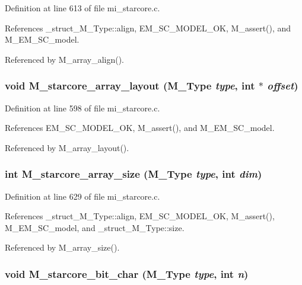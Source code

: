 Definition at line 613 of file mi\_\-starcore.c.

References \_\-struct\_\-M\_\-Type::align, EM\_\-SC\_\-MODEL\_\-OK, M\_\-assert(), and M\_\-EM\_\-SC\_\-model.

Referenced by M\_\-array\_\-align().
\subsubsection{\setlength{\rightskip}{0pt plus 5cm}void M\_\-starcore\_\-array\_\-layout (\bf{M\_\-Type} {\em type}, int $\ast$ {\em offset})}\label{m__starcore_8h_3ce7e6b6efff6a735ab856796b2670f1}




Definition at line 598 of file mi\_\-starcore.c.

References EM\_\-SC\_\-MODEL\_\-OK, M\_\-assert(), and M\_\-EM\_\-SC\_\-model.

Referenced by M\_\-array\_\-layout().
\subsubsection{\setlength{\rightskip}{0pt plus 5cm}int M\_\-starcore\_\-array\_\-size (\bf{M\_\-Type} {\em type}, int {\em dim})}\label{m__starcore_8h_82940fc9b64fa00d5d88d473228c9f4e}




Definition at line 629 of file mi\_\-starcore.c.

References \_\-struct\_\-M\_\-Type::align, EM\_\-SC\_\-MODEL\_\-OK, M\_\-assert(), M\_\-EM\_\-SC\_\-model, and \_\-struct\_\-M\_\-Type::size.

Referenced by M\_\-array\_\-size().
\subsubsection{\setlength{\rightskip}{0pt plus 5cm}void M\_\-starcore\_\-bit\_\-char (\bf{M\_\-Type} {\em type}, int {\em n})}\label{m__starcore_8h_ce008e1194ce9bb3d125e6ec2db74fbd}




